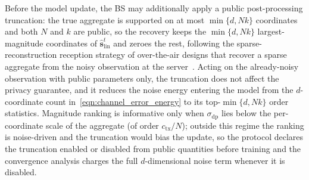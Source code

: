 \documentclass[journal]{IEEEtran}
\begin{document}
Before the model update, the BS may additionally apply a public post-processing truncation: the true aggregate is supported on at most $\min\{d,Nk\}$ coordinates and both $N$ and $k$ are public, so the recovery keeps the $\min\{d,Nk\}$ largest-magnitude coordinates of $\hat{\mathbf s}_{\mathrm{lin}}^t$ and zeroes the rest, following the sparse-reconstruction reception strategy of over-the-air designs that recover a sparse aggregate from the noisy observation at the server~\cite{amiri2020machine,jeon2021compressive}. Acting on the already-noisy observation with public parameters only, the truncation does not affect the privacy guarantee, and it reduces the noise energy entering the model from the $d$-coordinate count in~\eqref{eqn:channel_error_energy} to its top-$\min\{d,Nk\}$ order statistics. Magnitude ranking is informative only when $\sigma_{\mathrm{dp}}$ lies below the per-coordinate scale of the aggregate (of order $c_{\mathrm{tx}}/N$); outside this regime the ranking is noise-driven and the truncation would bias the update, so the protocol declares the truncation enabled or disabled from public quantities before training and the convergence analysis charges the full $d$-dimensional noise term whenever it is disabled.
\end{document}
